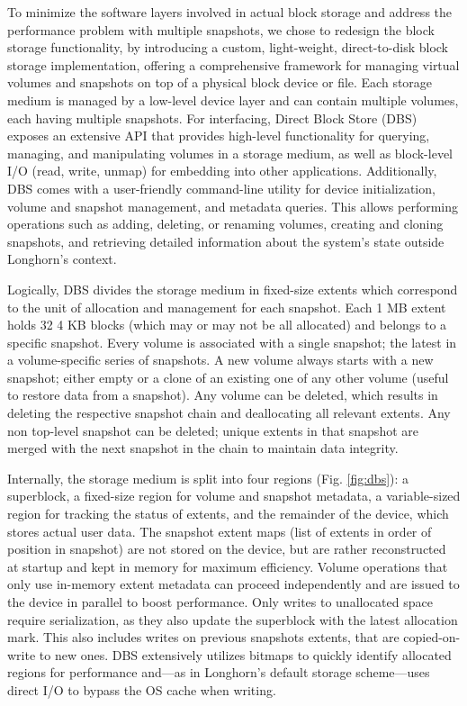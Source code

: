 To minimize the software layers involved in actual block storage and address the performance problem with multiple snapshots, we chose to redesign the block storage functionality, by introducing a custom, light-weight, direct-to-disk block storage implementation, offering a comprehensive framework for managing virtual volumes and snapshots on top of a physical block device or file. Each storage medium is managed by a low-level device layer and can contain multiple volumes, each having multiple snapshots. For interfacing, Direct Block Store (DBS) exposes an extensive API that provides high-level functionality for querying, managing, and manipulating volumes in a storage medium, as well as block-level I/O (read, write, unmap) for embedding into other applications. Additionally, DBS comes with a user-friendly command-line utility for device initialization, volume and snapshot management, and metadata queries. This allows performing operations such as adding, deleting, or renaming volumes, creating and cloning snapshots, and retrieving detailed information about the system's state outside Longhorn's context.

Logically, DBS divides the storage medium in fixed-size extents which correspond to the unit of allocation and management for each snapshot. Each 1 MB extent holds 32 4 KB blocks (which may or may not be all allocated) and belongs to a specific snapshot. Every volume is associated with a single snapshot; the latest in a volume-specific series of snapshots. A new volume always starts with a new snapshot; either empty or a clone of an existing one of any other volume (useful to restore data from a snapshot). Any volume can be deleted, which results in deleting the respective snapshot chain and deallocating all relevant extents. Any non top-level snapshot can be deleted; unique extents in that snapshot are merged with the next snapshot in the chain to maintain data integrity.

Internally, the storage medium is split into four regions (Fig. \ref{fig:dbs}): a superblock, a fixed-size region for volume and snapshot metadata, a variable-sized region for tracking the status of extents, and the remainder of the device, which stores actual user data. The snapshot extent maps (list of extents in order of position in snapshot) are not stored on the device, but are rather reconstructed at startup and kept in memory for maximum efficiency. Volume operations that only use in-memory extent metadata can proceed independently and are issued to the device in parallel to boost performance. Only writes to unallocated space require serialization, as they also update the superblock with the latest allocation mark. This also includes writes on previous snapshots extents, that are copied-on-write to new ones. DBS extensively utilizes bitmaps to quickly identify allocated regions for performance and---as in Longhorn's default storage scheme---uses direct I/O to bypass the OS cache when writing.

